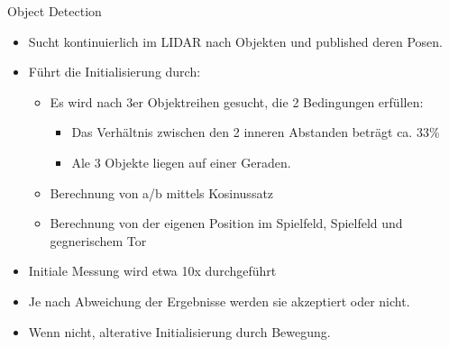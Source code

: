\begin{frame}{Object Detection}

\begin{itemize}
\item
  Sucht kontinuierlich im LIDAR nach Objekten und published deren Posen.
\item
  Führt die Initialisierung durch:

  \begin{itemize}
  \item
    Es wird nach 3er Objektreihen gesucht, die 2 Bedingungen erfüllen:

    \begin{itemize}
    \item
      Das Verhältnis zwischen den 2 inneren Abstanden beträgt ca. 33\%
    \item
      Ale 3 Objekte liegen auf einer Geraden.
    \end{itemize}
  \item
    Berechnung von a/b mittels Kosinussatz
  \item
    Berechnung von der eigenen Position im Spielfeld, Spielfeld und
    gegnerischem Tor
  \end{itemize}
\item
  Initiale Messung wird etwa 10x durchgeführt
\item
  Je nach Abweichung der Ergebnisse werden sie akzeptiert oder nicht.
\item
  Wenn nicht, alterative Initialisierung durch Bewegung.
\end{itemize}

\end{frame}

